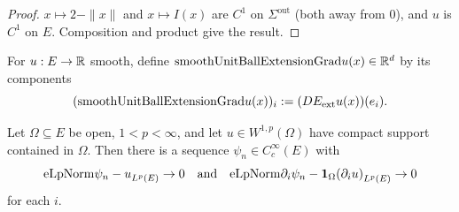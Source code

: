 \begin{proof}
\leanok
{}

$x \mapsto 2 - \|x\|$ and $x \mapsto I(x)$ are $C^1$ on $\Sigma^{\mathrm{out}}$
(both away from $0$), and $u$ is $C^1$ on $E$. Composition and product give
the result.
\end{proof}

\begin{definition}
\label{def:smoothUnitBallExtensionGrad}
\leanok
{}
For $u : E \to \mathbb{R}$ smooth, define
$\mathrm{smoothUnitBallExtensionGrad} u (x) \in \mathbb{R}^d$ by its components
\begin{equation*}
  (\mathrm{smoothUnitBallExtensionGrad} u(x))_i := (DE_{\mathrm{ext}} u (x))(e_i).
\end{equation*}
\end{definition}

\begin{theorem}
\label{thm:loc-global}
\leanok
{}
Let $\Omega \subseteq E$ be open, $1 < p < \infty$, and let $u \in W^{1,p}(\Omega)$
have compact support contained in $\Omega$. Then there is a sequence $\psi_n
\in C^\infty_c(E)$ with
\begin{equation*}
\mathrm{eLpNorm}{\psi_n - u}_{L^p(E)} \to 0
\quad\text{and}\quad
\mathrm{eLpNorm}{\partial_i \psi_n - \mathbf{1}_\Omega (\partial_i u)}_{L^p(E)} \to 0
\end{equation*}
for each $i$.
\end{theorem}

